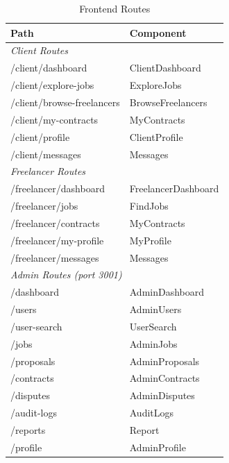 \documentclass[12pt,a4paper]{article}
\begin{document}
\begin{table}[h]
\centering
\small
\begin{tabular}{ll}
\toprule
\textbf{Path} & \textbf{Component} \\
\midrule
\multicolumn{2}{l}{\textit{Client Routes}} \\
/client/dashboard & ClientDashboard \\
/client/explore-jobs & ExploreJobs \\
/client/browse-freelancers & BrowseFreelancers \\
/client/my-contracts & MyContracts \\
/client/profile & ClientProfile \\
/client/messages & Messages \\
\midrule
\multicolumn{2}{l}{\textit{Freelancer Routes}} \\
/freelancer/dashboard & FreelancerDashboard \\
/freelancer/jobs & FindJobs \\
/freelancer/contracts & MyContracts \\
/freelancer/my-profile & MyProfile \\
/freelancer/messages & Messages \\
\midrule
\multicolumn{2}{l}{\textit{Admin Routes (port 3001)}} \\
/dashboard & AdminDashboard \\
/users & AdminUsers \\
/user-search & UserSearch \\
/jobs & AdminJobs \\
/proposals & AdminProposals \\
/contracts & AdminContracts \\
/disputes & AdminDisputes \\
/audit-logs & AuditLogs \\
/reports & Report \\
/profile & AdminProfile \\
\bottomrule
\end{tabular}
\caption{Frontend Routes}
\end{table}
\end{document}
